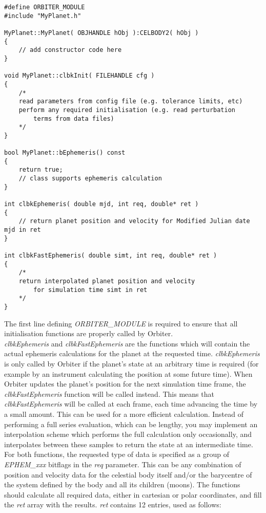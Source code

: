 \documentclass[Orbiter Developer Manual.tex]{subfiles}
\begin{document}
\begin{lstlisting}
#define ORBITER_MODULE
#include "MyPlanet.h"

MyPlanet::MyPlanet( OBJHANDLE hObj ):CELBODY2( hObj )
{
	// add constructor code here
}

void MyPlanet::clbkInit( FILEHANDLE cfg )
{
	/*
	read parameters from config file (e.g. tolerance limits, etc)
	perform any required initialisation (e.g. read perturbation
		terms from data files)
	*/
}

bool MyPlanet::bEphemeris() const
{
	return true;
	// class supports ephemeris calculation
}

int clbkEphemeris( double mjd, int req, double* ret )
{
	// return planet position and velocity for Modified Julian date mjd in ret
}

int clbkFastEphemeris( double simt, int req, double* ret )
{
	/*
	return interpolated planet position and velocity
		for simulation time simt in ret
	*/
}
\end{lstlisting}

\noindent
The first line defining \textit{ORBITER\_MODULE} is required to ensure that all initialisation functions are properly called by Orbiter.\\
\textit{clbkEphemeris} and \textit{clbkFastEphemeris} are the functions which will contain the actual ephemeris calculations for the planet at the requested time. \textit{clbkEphemeris} is only called by Orbiter if the planet's state at an arbitrary time is required (for example by an instrument calculating the position at some future time). When Orbiter updates the planet's position for the next simulation time frame, the \textit{clbkFastEphemeris} function will be called instead. This means that \textit{clbkFastEphemeris} will be called at each frame, each time advancing the time by a small amount. This can be used for a more efficient calculation. Instead of performing a full series evaluation, which can be lengthy, you may implement an interpolation scheme which performs the full calculation only occasionally, and interpolates between these samples to return the state at an intermediate time.\\
For both functions, the requested type of data is specified as a group of \textit{EPHEM\_xxx} bitflags in the \textit{req} parameter. This can be any combination of position and velocity data for the celestial body itself and/or the barycentre of the system defined by the body and all its children (moons). The functions should calculate all required data, either in cartesian or polar coordinates, and fill the \textit{ret} array with the results. \textit{ret} contains 12 entries, used as follows:
\end{document}
